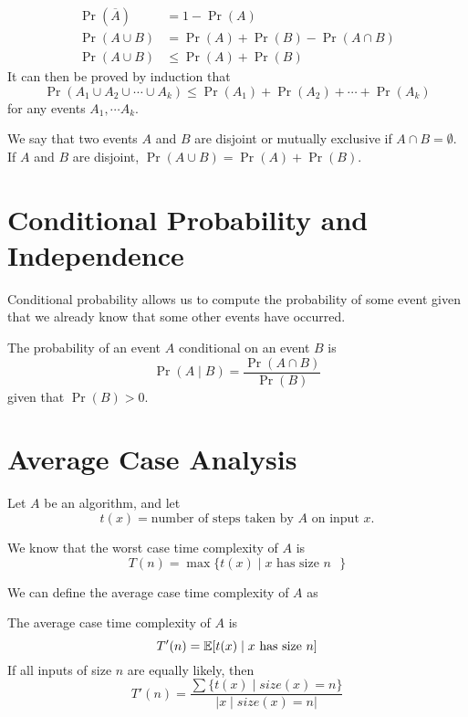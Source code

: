 \begin{theorem}
    $$
    \begin{aligned}
        \Pr(\overline{A}) &= 1 - \Pr(A) \\
        \Pr(A \cup B) &= \Pr(A) + \Pr(B) - \Pr(A \cap B) \\
        \Pr(A \cup B) &\leq \Pr(A) + \Pr(B)
    \end{aligned}
    $$
    It can then be proved by induction that
    $$
    \Pr(A_1 \cup A_2 \cup \cdots \cup A_k) \leq \Pr(A_1) + \Pr(A_2) + \cdots + \Pr(A_k)
    $$
    for any events $A_1, \cdots A_k$.
\end{theorem}

We say that two events $A$ and $B$ are disjoint or mutually exclusive if $A \cap B = \emptyset$. If $A$ and $B$ are disjoint, $\Pr(A \cup B) = \Pr(A) + \Pr(B)$.

\section{Conditional Probability and Independence}

Conditional probability allows us to compute the probability of some event given that we already know that some other events have occurred.

\begin{definition} 
    The probability of an event $A$ conditional on an event $B$ is
    $$
    \Pr(A \mid B) = \frac{\Pr(A \cap B)}{\Pr(B)}
    $$
    given that $\Pr(B) > 0$. 
\end{definition}

\section{Average Case Analysis}

Let $A$ be an algorithm, and let
\[
t(x) = \text{number of steps taken by $A$ on input $x$}
.\] 

We know that the worst case time complexity of $A$ is
$$
T(n) = \max \{ t(x) \mid \text{$x$ has size $n$ } \}
$$

We can define the average case time complexity of $A$ as

\begin{definition}
    The average case time complexity of $A$ is
    $$
    T'(n) = \mathbb{E} [ t(x) \mid \text{$x$ has size $n$} ]
    $$
    If all inputs of size $n$ are equally likely, then
    $$
    T'(n) = \frac{\sum \{ t(x) \mid size(x) = n \}}{| x \mid size(x) = n |}
    $$
\end{definition}


